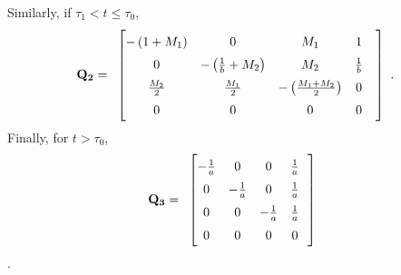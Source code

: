 \documentclass[11pt]{article}
\begin{document}
Similarly, if $\tau_{1}< t \leq \tau_{0}$, 
\begin{equation}
\label{matrix:Q2}
\renewcommand{\arraystretch}{1.5}
\mathbf{Q_{2}}=\begin{array}{c}
\begin{bmatrix}
				-\left(1+M_{1}\right) & 0 & M_{1} & 1 &\\
			          0 & -\left(\frac{1}{b}+M_{2}\right) & M_{2} & \frac{1}{b} & \\
                                          \frac{M_{2}}{2} & \frac{M_{1}}{2} & -\left(\frac{M_{1}+M_{2}}{2}\right) & 0 & \\
			          0 & 0 & 0 & 0 &
\end{bmatrix}
\end{array}.
\end{equation} 
Finally, for $t > \tau_{0}$, 
\begin{equation}
\label{matrix:Q3}
\renewcommand{\arraystretch}{1.5}
\mathbf{Q_{3}}=\begin{array}{c}
\begin{bmatrix}
				-\frac{1}{a}&0&0&\frac{1}{a}&\!\!\\
				0&-\frac{1}{a}&0&\frac{1}{a}&\!\!\\
				0&0&-\frac{1}{a}&\frac{1}{a}&\!\!\\ 
				0&0&0&0&\!\!
\end{bmatrix}
\end{array} 
\end{equation}
\citep{Kingman1982c, Kingman1982a, Kingman1982b}.
\end{document}
